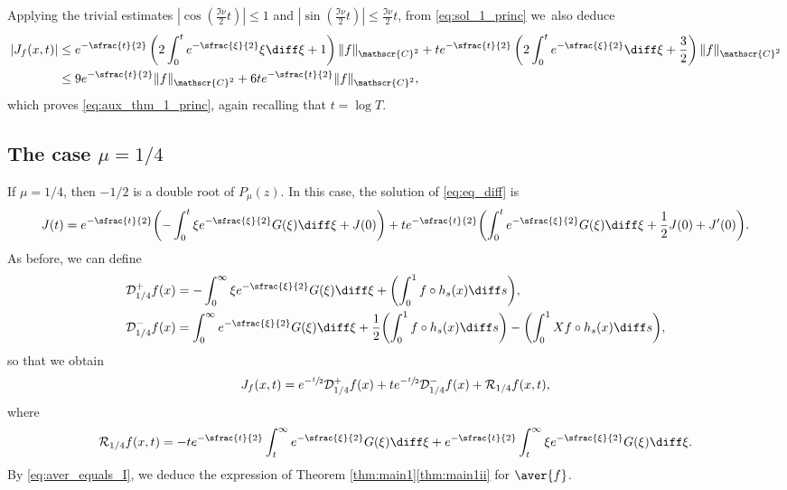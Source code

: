 Applying the trivial estimates $|\cos(\frac{\Im\nu}{2} t)|\leq 1$ and $|\sin(\frac{\Im\nu}{2} t)|\leq \frac{\Im\nu}{2} t$, from \eqref{eq:sol_1_princ} we~also deduce
\begin{equation*}
\begin{split}
|J_f(x,t)|&\leq e^{-\sfrac{t}{2}} \left(2 \int_0^t e^{-\sfrac{\xi}{2}} \xi \diff \xi +1\right) \|f\|_{\mathscr{C}^2} + t e^{-\sfrac{t}{2}} \left(2 \int_0^t e^{-\sfrac{\xi}{2}} \diff \xi +\frac{3}{2}\right) \|f\|_{\mathscr{C}^2}\\
& \leq 9 e^{-\sfrac{t}{2}} \|f\|_{\mathscr{C}^2} + 6t e^{-\sfrac{t}{2}} \|f\|_{\mathscr{C}^2},
\end{split}
\end{equation*}
which proves \eqref{eq:aux_thm_1_princ}, again recalling that $t = \log T$.

\subsection{The case $\mu = 1/4$}\label{sec:14}

If $\mu = 1/4$, then $-1/2$ is a double root of $P_\mu(z)$. In this case, the solution of \eqref{eq:eq_diff} is
\begin{equation*}
J(t) = e^{-\sfrac{t}{2}} \biggl(- \int_0^t \xi e^{-\sfrac{\xi}{2}} G(\xi) \diff \xi + J(0) \biggr) + t e^{-\sfrac{t}{2}} \biggl(\int_0^t e^{-\sfrac{\xi}{2}} G(\xi) \diff \xi + \frac{1}{2} J(0) + J'(0) \biggr).
\end{equation*}
As before, we can define
\begin{equation*}
\begin{split}
&\mathcal{D}_{1/4}^{+}f(x) = - \int_0^\infty \xi e^{-\sfrac{\xi}{2}} G(\xi) \diff \xi + \biggl(\int_0^1 f \circ h_s(x) \diff s \biggr),\\
&\mathcal{D}_{1/4}^{-}f(x) = \int_0^\infty e^{-\sfrac{\xi}{2}} G(\xi) \diff \xi + \frac{1}{2} \biggl(\int_0^1 f \circ h_s(x) \diff s \biggr) - \biggl(\int_0^1 Xf \circ h_s(x) \diff s \biggr),
\end{split}
\end{equation*}
so that we obtain
\begin{equation}\label{eq:I_mu_14}
J_{f}(x,t) = e^{-\sfrac{t}{2}} \mathcal{D}_{1/4}^{+}f(x) + t e^{-\sfrac{t}{2}} \mathcal{D}_{1/4}^{-}f(x) + \mathcal{R}_{1/4}f(x,t),
\end{equation}
where
\[
\mathcal{R}_{1/4}f(x,t) = - t e^{-\sfrac{t}{2}} \int_t^{\infty} e^{-\sfrac{\xi}{2}} G(\xi) \diff \xi + e^{-\sfrac{t}{2}} \int_t^{\infty} \xi e^{-\sfrac{\xi}{2}} G(\xi) \diff \xi.
\]
By \eqref{eq:aver_equals_I}, we deduce the expression of Theorem \ref{thm:main1}\eqref{thm:main1ii} for $\aver{f}$.

